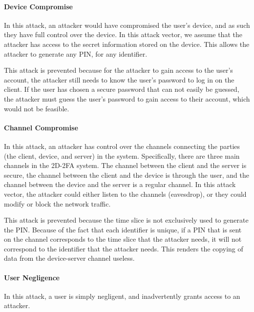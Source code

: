\documentclass[11pt]{article}
\begin{document}

\paragraph{Device Compromise}
In this attack, an attacker would have compromised the user's device,
and as such they have full control over the device. In this attack
vector, we assume that the attacker has access to the secret information
stored on the device. This allows the attacker to generate any PIN, for
any identifier.

This attack is prevented because for the attacker to gain access to the
user's account, the attacker still needs to know the user's password to
log in on the client. If the user has chosen a secure password that can
not easily be guessed, the attacker must guess the user's password to
gain access to their account, which would not be feasible. 


\paragraph{Channel Compromise}
In this attack, an attacker has control over the channels connecting the
parties (the client, device, and server) in the system. Specifically,
there are three main channels in the 2D-2FA system. The channel between
the client and the server is secure, the channel between the client and
the device is through the user, and the channel between the device and
the server is a regular channel. In this attack vector, the attacker
could either listen to the channels (eavesdrop), or they could modify or
block the network traffic. 

This attack is prevented because the time slice is not exclusively used
to generate the PIN. Because of the fact that each identifier is unique,
if a PIN that is sent on the channel corresponds to the time slice that
the attacker needs, it will not correspond to the identifier that the
attacker needs. This renders the copying of data from the device-server
channel useless. 


\paragraph{User Negligence}
In this attack, a user is simply negligent, and inadvertently grants
access to an attacker. 
\end{document}
